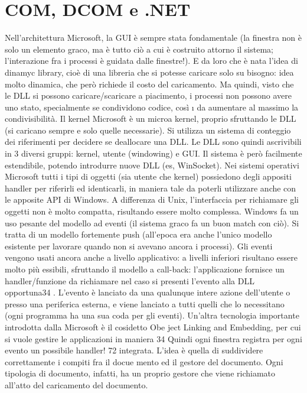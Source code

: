 
\section{COM, DCOM e .NET}
Nell'architettura Microsoft, la GUI è sempre stata fondamentale (la finestra non è solo un elemento graco, ma è tutto
ciò a cui è costruito attorno il sistema; l'interazione fra i processi è guidata dalle finestre!). E da loro che è nata
l'idea
di dinamyc library, cioè di una libreria che si potesse caricare solo su bisogno:
idea molto dinamica, che però richiede il costo del caricamento.
Ma quindi, visto che le DLL si possono caricare/scaricare a piacimento, i
processi non possono avere uno stato, specialmente se condividono codice, così
\i{}
da aumentare al massimo la condivisibilità. Il kernel Microsoft è un microa
kernel, proprio sfruttando le DLL (si caricano sempre e solo quelle necessarie).
Si utilizza un sistema di conteggio dei riferimenti per decidere se deallocare una
DLL.
Le DLL sono quindi ascrivibili in 3 diversi gruppi: kernel, utente (windowing) e GUI. Il sistema è però facilmente
estendibile, potendo introdurre nuove
DLL (es, WinSocket).
Nei sistemi operativi Microsoft tutti i tipi di oggetti (sia utente che kernel)
possiedono degli appositi handler per riferirli ed identicarli, in maniera tale da
poterli utilizzare anche con le apposite API di Windows. A differenza di Unix,
l'interfaccia per richiamare gli oggetti non è molto compatta, risultando essere
molto complessa.
Windows fa un uso pesante del modello ad eventi (il sistema graco fa un
buon match con ciò). Si tratta di un modello fortemente push (all'epoca era
anche l'unico modello esistente per lavorare quando non si avevano ancora i
processi). Gli eventi vengono usati ancora anche a livello applicativo: a livelli
inferiori risultano essere molto più essibili, sfruttando il modello a call-back:
l'applicazione fornisce un handler/funzione da richiamare nel caso si presenti
l'evento alla DLL opportuna34 . L'evento è lanciato da una qualunque intere
azione dell'utente o presso una periferica esterna, e viene lanciato a tutti quelli
che lo necessitano (ogni programma ha una sua coda per gli eventi).
Un'altra tecnologia importante introdotta dalla Microsoft è il cosidetto Obe
ject Linking and Embedding, per cui si vuole gestire le applicazioni in maniera
34 Quindi
ogni finestra registra per ogni evento un possibile handler!
72
integrata. L'idea è quella di suddividere correttamente i compiti fra il docue
mento ed il gestore del documento. Ogni tipologia di documento, infatti, ha un
proprio gestore che viene richiamato all'atto del caricamento del documento.
